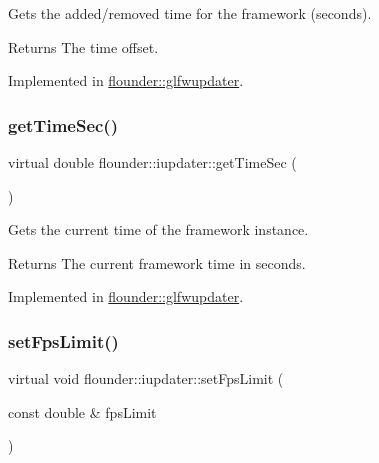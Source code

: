 Gets the added/removed time for the framework (seconds). 

\begin{DoxyReturn}{Returns}
The time offset. 
\end{DoxyReturn}


Implemented in \hyperlink{classflounder_1_1glfwupdater_a6393f60d2b0f84a78ccf14b0c55ae1ee}{flounder\+::glfwupdater}.

\mbox{\label{classflounder_1_1iupdater_a071086b844e1f90d7f3577e80c9c09fe}} 
\subsubsection{\texorpdfstring{get\+Time\+Sec()}{getTimeSec()}}
{\footnotesize\ttfamily virtual double flounder\+::iupdater\+::get\+Time\+Sec (\begin{DoxyParamCaption}{ }\end{DoxyParamCaption})\hspace{0.3cm}{\ttfamily [pure virtual]}}



Gets the current time of the framework instance. 

\begin{DoxyReturn}{Returns}
The current framework time in seconds. 
\end{DoxyReturn}


Implemented in \hyperlink{classflounder_1_1glfwupdater_a6982b83970693347bfa460adc04cf984}{flounder\+::glfwupdater}.

\mbox{\label{classflounder_1_1iupdater_a09eee014e76b7a0217d2bcdf41e0f3f4}} 
\subsubsection{\texorpdfstring{set\+Fps\+Limit()}{setFpsLimit()}}
{\footnotesize\ttfamily virtual void flounder\+::iupdater\+::set\+Fps\+Limit (\begin{DoxyParamCaption}\item[{const double \&}]{fps\+Limit }\end{DoxyParamCaption})\hspace{0.3cm}{\ttfamily [pure virtual]}}




